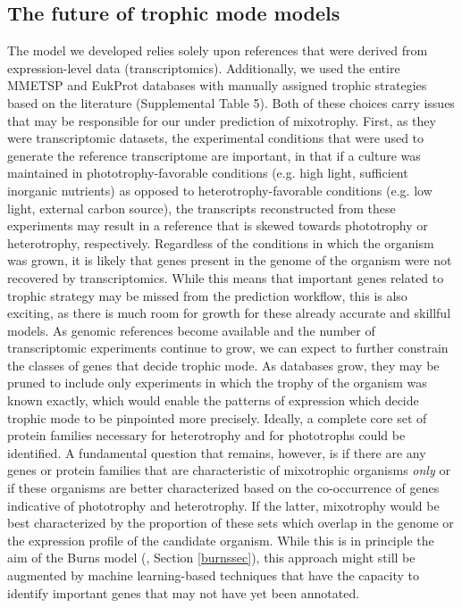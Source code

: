 \documentclass[12pt]{article}
\numberwithin{equation}{section}
\begin{document}
\subsection{The future of trophic mode models}\label{limitations}
The model we developed relies solely upon references that were derived from expression-level data (transcriptomics). Additionally, we used the entire MMETSP \citep{Keeling2014} and EukProt \citep{Richter2020EukProt} databases with manually assigned trophic strategies based on the literature (Supplemental Table 5). Both of these choices carry issues that may be responsible for our under prediction of mixotrophy. First, as they were transcriptomic datasets, the experimental conditions that were used to generate the reference transcriptome are important, in that if a culture was maintained in phototrophy-favorable conditions (e.g. high light, sufficient inorganic nutrients) as opposed to heterotrophy-favorable conditions (e.g. low light, external carbon source), the transcripts reconstructed from these experiments  may result in a reference that is skewed towards phototrophy or heterotrophy, respectively. Regardless of the conditions in which the organism was grown, it is likely that genes present in the genome of the organism were not recovered by transcriptomics. While this means that important genes related to trophic strategy may be missed from the prediction workflow, this is also exciting, as there is much room for growth for these already accurate and skillful models. As genomic references become available and the number of transcriptomic experiments continue to grow, we can expect to further constrain the classes of genes that decide trophic mode. As databases grow, they may be pruned to include only experiments in which the trophy of the organism was known exactly, which would enable the patterns of expression which decide trophic mode to be  pinpointed more precisely. Ideally, a complete core set of protein families necessary for heterotrophy and for phototrophs could be identified. A fundamental question that remains, however, is if there are any genes or protein families that are characteristic of mixotrophic organisms \textit{only} or if these organisms are better characterized based on the co-occurrence of genes indicative of phototrophy and heterotrophy. If the latter,  mixotrophy would be best characterized by the proportion of these sets which overlap in the genome or the expression profile of the candidate organism. While this is in principle the aim of the Burns model (\cite{burns2018gene}, Section \ref{burnssec}), this approach might still be augmented by machine learning-based techniques that have the capacity to identify important genes that may not have yet been annotated. 
\end{document}
